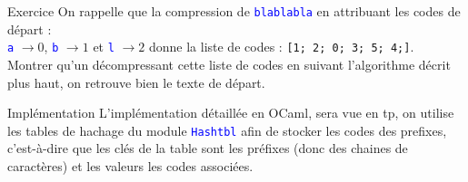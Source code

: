 \documentclass[10pt]{beamer}
\begin{document}
\begin{frame}{\Ctitle}{\stitle}
	\begin{exampleblock}{Exercice}
		On rappelle que la compression de \textcolor{blue}{\tt blablabla} en attribuant les codes de départ :\\ \textcolor{blue}{\tt a} $\rightarrow 0$, \textcolor{blue}{\tt b} $\rightarrow 1$ et \textcolor{blue}{\tt l} $\rightarrow 2$ donne la liste de codes : {\tt [1; 2; 0; 3; 5; 4;]}. \\
		Montrer qu'un décompressant cette liste de codes en suivant l'algorithme décrit plus haut, on retrouve bien le texte de départ.
	\end{exampleblock}
\end{frame}

\begin{frame}{\Ctitle}{\stitle}
	\begin{block}{Implémentation}
		L'implémentation détaillée en OCaml, sera vue en {\sc tp}, on utilise les tables de hachage du module \textcolor{blue}{\tt Hashtbl} afin de stocker les codes des prefixes, c'est-à-dire que les clés de la table sont les préfixes (donc des chaines de caractères) et les valeurs les codes associées.
	\end{block}
\end{frame}
\end{document}
